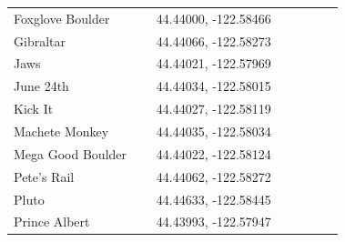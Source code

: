 \begin{flushleft}
\begin{center}
\begin{supertabular}{p{0.38\linewidth}p{0.5\linewidth}}
Foxglove Boulder & 44.44000, -122.58466 \\
Gibraltar & 44.44066, -122.58273 \\
Jaws & 44.44021, -122.57969 \\
June 24th & 44.44034, -122.58015 \\
Kick It & 44.44027, -122.58119 \\
Machete Monkey & 44.44035, -122.58034 \\
Mega Good Boulder & 44.44022, -122.58124 \\
Pete's Rail & 44.44062, -122.58272 \\
Pluto & 44.44633, -122.58445 \\
Prince Albert & 44.43993, -122.57947 \\

\end{supertabular}
\end{center}
\end{flushleft}
